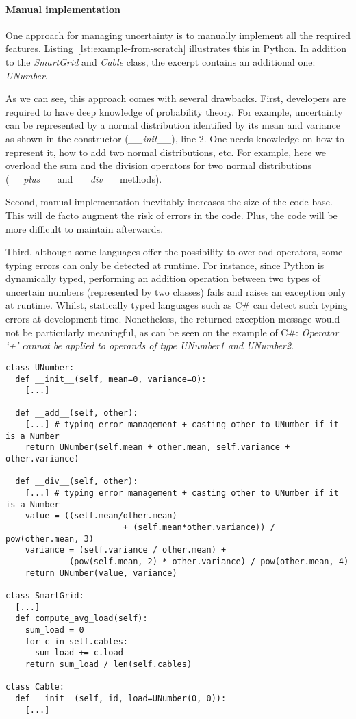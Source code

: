 \paragraph{Manual implementation} 
One approach for managing uncertainty is to manually implement all the required features.
Listing~\ref{lst:example-from-scratch} illustrates this in Python.
In addition to the \textit{SmartGrid} and \textit{Cable} class, the excerpt contains an additional one: \textit{UNumber}.

As we can see, this approach comes with several drawbacks.
First, developers are required to have deep knowledge of probability theory.
For example, uncertainty can be represented by a normal distribution identified by its mean and variance as shown in the constructor (\textit{\_\_init\_\_}), line 2.
One needs knowledge on how to represent it, how to add two normal distributions, etc.
For example, here we overload the sum and the division operators for two normal distributions (\textit{\_\_plus\_\_} and \textit{\_\_div\_\_} methods).

Second, manual implementation inevitably increases the size of the code base.
This will de facto augment the risk of errors in the code.
Plus, the code will be more difficult to maintain afterwards.

Third, although some languages offer the possibility to overload operators, some typing errors can only be detected at runtime. 
For instance, since Python is dynamically typed, performing an addition operation between two types of uncertain numbers (\ie represented by two classes) fails and raises an exception only at runtime.
Whilst, statically typed languages such as C\# can detect such typing errors at development time. 
Nonetheless, the returned exception message would not be particularly meaningful, as can be seen on the example of  C\#: \textit{Operator `+' cannot be applied to operands of type UNumber1 and UNumber2}.

\begin{lstlisting}[style=pythonStyle, caption=Manual management of uncertainty in Python, label=lst:example-from-scratch, linewidth=0.97\textwidth
]
class UNumber:
  def __init__(self, mean=0, variance=0):
    [...]
    
  def __add__(self, other):
    [...] # typing error management + casting other to UNumber if it is a Number
    return UNumber(self.mean + other.mean, self.variance + other.variance)
    
  def __div__(self, other):
    [...] # typing error management + casting other to UNumber if it is a Number
    value = ((self.mean/other.mean)  
                        + (self.mean*other.variance)) / pow(other.mean, 3)
    variance = (self.variance / other.mean) +
             (pow(self.mean, 2) * other.variance) / pow(other.mean, 4)
    return UNumber(value, variance)

class SmartGrid:
  [...]
  def compute_avg_load(self):
    sum_load = 0
    for c in self.cables:
      sum_load += c.load
    return sum_load / len(self.cables)
    
class Cable:
  def __init__(self, id, load=UNumber(0, 0)):
    [...]
\end{lstlisting}

